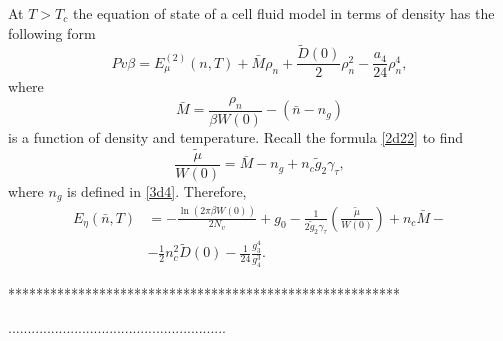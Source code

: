 \documentclass[12pt]{article}
\begin{document}
	
	At $T>T_c$ the equation of state of a cell fluid model in terms of density has the following form
	\begin{equation}\label{eq:eosNT}
	Pv\beta = E_\mu^{(2)}(n,T) + \bar M \rho_{n} + \frac{\tilde D(0)}{2} \rho_{n}^2 - \frac{a_4}{24} \rho_{n}^4,
	\end{equation}
	where
	\begin{equation}\label{3d30}
	\bar M = \frac{\rho_{n}}{\beta W(0)} - (\bar n - n_g)
	\end{equation}
	is a function of density and temperature. Recall the formula \eqref{2d22} to find
	\begin{equation}\label{3d31}
	\frac{\tilde\mu}{W(0)} = \bar M - n_g + n_c \tilde g_2 \gamma_\tau,
	\end{equation}
	where $n_g$ is defined in \eqref{3d4}. Therefore,
	\begin{align}\label{3d32}
		E_\eta (\bar n,T) & = - \frac{\ln (2\pi \beta W(0))}{2 N_v} + g_0 - \frac{1}{2\tilde g_2 \gamma_\tau} \left( \frac{\tilde\mu}{W(0)}\right)  + n_c \bar M- \nonumber \\
		& - \frac{1}{2} n_c^2 \tilde D(0) - \frac{1}{24} \frac{g_3^4}{g_4^3}.
	\end{align}
	
	********************************************************
	
	........................................................
	
\end{document}
